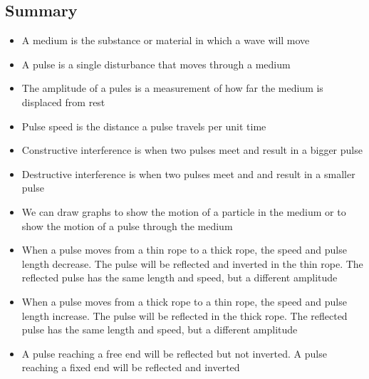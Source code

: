            \subsection{ Summary}
            \nopagebreak
            \label{m38802*eip-404}\begin{itemize}[noitemsep]
            \item A medium is the substance or material in which a wave will move\item A pulse is a single disturbance that moves through a medium\item The amplitude of a pules is a measurement of how far the medium is displaced from rest\item Pulse speed is the distance a pulse travels per unit time\item Constructive interference is when two pulses meet and result in a bigger pulse\item Destructive interference is when two pulses meet and and result in a smaller pulse\item We can draw graphs to show the motion of a particle in the medium or to show the motion of a pulse through the medium\item When a pulse moves from a thin rope to a thick rope, the speed and pulse length decrease. The pulse will be reflected and inverted in the thin rope. The reflected pulse has the same length and speed, but a different amplitude\item When a pulse moves from a thick rope to a thin rope, the speed and pulse length increase. The pulse will be reflected in the thick rope. The reflected pulse has the same length and speed, but a different amplitude\item A pulse reaching a free end will be reflected but not inverted. A pulse reaching a fixed end will be reflected and inverted\end{itemize}
        \label{m38802*cid9}
